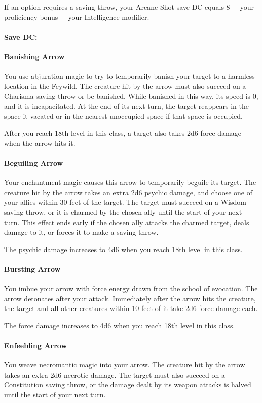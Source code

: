 \documentclass[letterpaper,openany,oneside,twocolumn]{book}
\begin{document}
If an option requires a saving throw, your Arcane Shot save DC equals 8 + your proficiency bonus + your Intelligence modifier.\\\\
\textbf{Save DC: }

\paragraph{Banishing Arrow} You use abjuration magic to try to temporarily banish your target to a harmless location in the Feywild. The creature hit by the arrow must also succeed on a Charisma saving throw or be banished. While banished in this way, its speed is 0, and it is incapacitated. At the end of its next turn, the target reappears in the space it vacated or in the nearest unoccupied space if that space is occupied.

After you reach 18th level in this class, a target also takes 2d6 force damage when the arrow hits it.

\paragraph{Beguiling Arrow} Your enchantment magic causes this arrow to temporarily beguile its target. The creature hit by the arrow takes an extra 2d6 psychic damage, and choose one of your allies within 30 feet of the target. The target must succeed on a Wisdom saving throw, or it is charmed by the chosen ally until the start of your next turn. This effect ends early if the chosen ally attacks the charmed target, deals damage to it, or forces it to make a saving throw.

The psychic damage increases to 4d6 when you reach 18th level in this class.

\paragraph{Bursting Arrow} You imbue your arrow with force energy drawn from the school of evocation. The arrow detonates after your attack. Immediately after the arrow hits the creature, the target and all other creatures within 10 feet of it take 2d6 force damage each.

The force damage increases to 4d6 when you reach 18th level in this class.

\paragraph{Enfeebling Arrow} You weave necromantic magic into your arrow. The creature hit by the arrow takes an extra 2d6 necrotic damage. The target must also succeed on a Constitution saving throw, or the damage dealt by its weapon attacks is halved until the start of your next turn.
\end{document}
